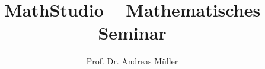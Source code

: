 %
%
%
\title[MathStudio]{MathStudio -- Mathematisches Seminar}
\author[A.~Müller]{Prof. Dr. Andreas Müller}
\begin{frame}
\titlepage
\end{frame}
